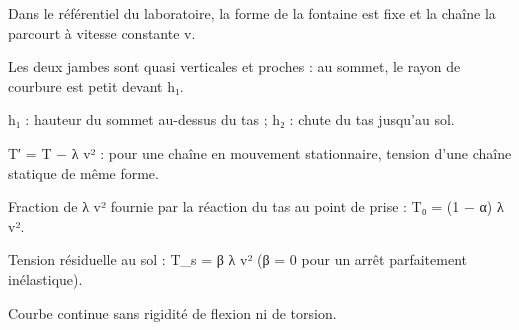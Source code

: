 \begin{hypothese}\label{h_stat}
Dans le référentiel du laboratoire, la forme de la fontaine est fixe et la chaîne la parcourt à vitesse constante v.
\end{hypothese}

\begin{hypothese}\label{h_etroite}
Les deux jambes sont quasi verticales et proches : au sommet, le rayon de courbure est petit devant h₁.
\end{hypothese}

\begin{definition}[Hauteurs h₁ et h₂]\label{def_hauteurs}
h₁ : hauteur du sommet au-dessus du tas ; h₂ : chute du tas jusqu’au sol.
\end{definition}

\begin{definition}\label{def_t_eff}
T′ = T − λ v² : pour une chaîne en mouvement stationnaire, tension d’une chaîne statique de même forme.
\end{definition}

\begin{definition}\label{def_alpha}
Fraction de λ v² fournie par la réaction du tas au point de prise : T₀ = (1 − α) λ v².
\end{definition}

\begin{definition}\label{def_beta}
Tension résiduelle au sol : T\_s = β λ v² (β = 0 pour un arrêt parfaitement inélastique).
\end{definition}

\begin{choix_modelisation}\label{ch_souple}
Courbe continue sans rigidité de flexion ni de torsion.
\end{choix_modelisation}

